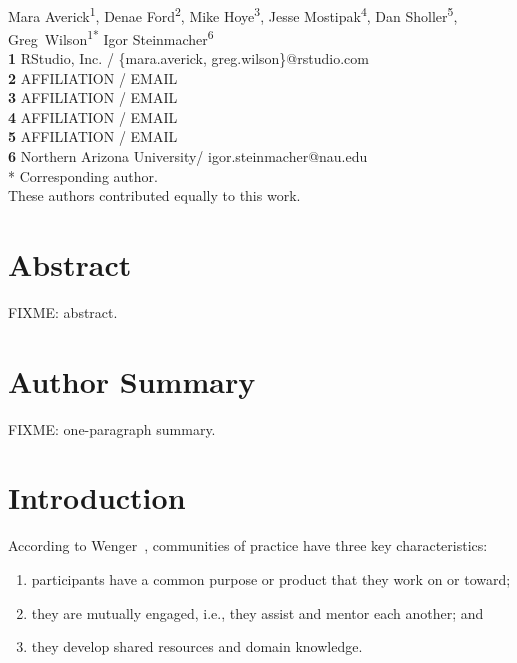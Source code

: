 \documentclass[10pt,letterpaper]{article}
\begin{document}
\vspace*{0.2in}

\begin{flushleft}
{\Large
\textbf{}
}
\newline
\\
{Mara Averick}\textsuperscript{1{\ddag}},
{Denae Ford}\textsuperscript{2{\ddag}},
{Mike Hoye}\textsuperscript{3{\ddag}},
{Jesse Mostipak}\textsuperscript{4{\ddag}},
{Dan Sholler}\textsuperscript{5{\ddag}},
{Greg~Wilson}\textsuperscript{1{\ddag}*}
{Igor Steinmacher}\textsuperscript{6{\ddag}}
\\
\bigskip
\textbf{1} RStudio, Inc. / \{mara.averick, greg.wilson\}@rstudio.com \\
\textbf{2} AFFILIATION / EMAIL \\
\textbf{3} AFFILIATION / EMAIL \\
\textbf{4} AFFILIATION / EMAIL \\
\textbf{5} AFFILIATION / EMAIL \\
\textbf{6} Northern Arizona University/ igor.steinmacher@nau.edu \\\bigskip
* Corresponding author. \\
\bigskip
{\ddag} These authors contributed equally to this work.
\end{flushleft}

\section*{Abstract}

FIXME: abstract.

\section*{Author Summary}

FIXME: one-paragraph summary.

\section*{Introduction}

According to Wenger~\cite{wenger1999}, communities of practice have three key characteristics:

\begin{enumerate}

\item participants have a common purpose or product that they work on or toward;

\item they are mutually engaged, i.e., they assist and mentor each another; and

\item they develop shared resources and domain knowledge.

\end{enumerate}
\end{document}

